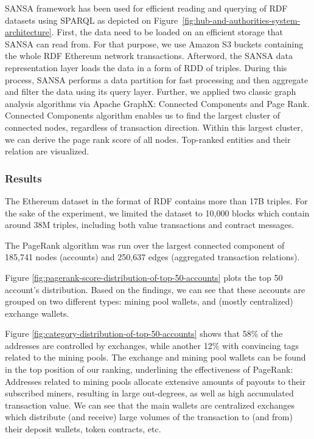 SANSA framework has been used for efficient reading and querying of \gls{RDF} datasets using \gls{SPARQL} as depicted on Figure~\ref{fig:hub-and-authorities-system-architecture}. 
First, the data need to be loaded on an efficient storage that SANSA can read from. 
For that purpose, we use Amazon S3 buckets containing the whole \gls{RDF} Ethereum network transactions.
Afterword, the SANSA data representation layer loads the data in a form of \gls{RDD} of triples. 
During this process, SANSA performs a data partition for fast processing and then aggregate and filter the data using its query layer. 
Further, we applied two classic graph analysis algorithms via Apache GraphX: Connected Components and Page Rank.
Connected Components algorithm enables us to find the largest cluster of connected nodes, regardless of transaction direction. Within this largest cluster, we can derive the page rank score of all nodes. Top-ranked entities and their relation are visualized.

\subsubsection{Results}
The Ethereum dataset in the format of \gls{RDF} contains more than 17B triples.
For the sake of the experiment, we limited the dataset to 10,000 blocks which contain around 38M triples, including both value transactions and contract messages.

The PageRank algorithm was run over the largest connected component of 185,741 nodes (accounts) and 250,637 edges (aggregated transaction relations).

Figure \ref{fig:pagerank-score-distribution-of-top-50-accounts} plots the top 50 account's distribution. 
Based on the findings, we can see that these accounts are grouped on two different types: mining pool wallets, and (mostly centralized) exchange wallets. 

Figure \ref{fig:category-distribution-of-top-50-accounts} shows that 58\% of the addresses are controlled by exchanges, while another 12\% with convincing tags related to the mining pools.
The exchange and mining pool wallets can be found in the top position of our ranking, underlining the effectiveness of PageRank: Addresses related to mining pools allocate extensive amounts of payouts to their subscribed miners, resulting in large out-degrees, as well as high accumulated transaction value.
We can see that the main wallets are centralized exchanges which distribute (and receive) large volumes of the transaction to (and from) their deposit wallets, token contracts, etc.


